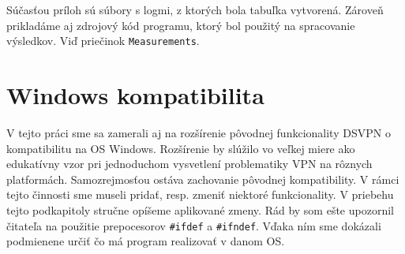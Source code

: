 \begin{table}[h!]
	\centering
	\caption{Výsledky získaných meraní}
	\label{tabmer}
\end{table}

Súčasťou príloh sú súbory s logmi, z ktorých bola tabuľka vytvorená. Zároveň prikladáme aj zdrojový kód programu, ktorý bol použitý na spracovanie výsledkov. Viď priečinok \lstinline|Measurements|. 
\section{Windows kompatibilita}
V tejto práci sme sa zamerali aj na rozšírenie pôvodnej funkcionality DSVPN o kompatibilitu na OS Windows. Rozšírenie by slúžilo vo veľkej miere ako edukatívny vzor pri jednoduchom vysvetlení problematiky VPN na rôznych platformách. Samozrejmosťou ostáva zachovanie pôvodnej kompatibility. V rámci tejto činnosti sme museli pridať, resp. zmeniť niektoré funkcionality. V priebehu tejto podkapitoly stručne opíšeme aplikované zmeny. Rád by som ešte upozornil čitateľa na použitie prepocesorov \lstinline|#ifdef| a \lstinline|#ifndef|. Vďaka ním sme dokázali podmienene určiť čo má program realizovať v danom OS.

